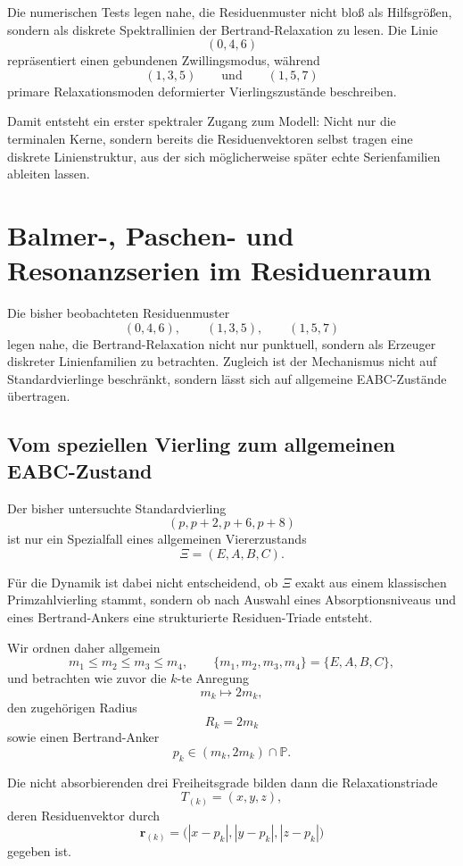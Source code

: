 \documentclass[11pt,a4paper]{article}
\theoremstyle{definition}
\theoremstyle{plain}
\theoremstyle{remark}
\begin{document}
	Die numerischen Tests legen nahe, die Residuenmuster nicht bloß als Hilfsgrößen, sondern als diskrete Spektrallinien der Bertrand-Relaxation zu lesen. 
	Die Linie
	\[
	(0,4,6)
	\]
	repräsentiert einen gebundenen Zwillingsmodus, während
	\[
	(1,3,5)
	\qquad\text{und}\qquad
	(1,5,7)
	\]
	primare Relaxationsmoden deformierter Vierlingszustände beschreiben.
	
	Damit entsteht ein erster spektraler Zugang zum Modell: 
	Nicht nur die terminalen Kerne, sondern bereits die Residuenvektoren selbst tragen eine diskrete Linienstruktur, aus der sich möglicherweise später echte Serienfamilien ableiten lassen.
	
	\section{Balmer-, Paschen- und Resonanzserien im Residuenraum}
	
	Die bisher beobachteten Residuenmuster
	\[
	(0,4,6),\qquad (1,3,5),\qquad (1,5,7)
	\]
	legen nahe, die Bertrand-Relaxation nicht nur punktuell, sondern als Erzeuger diskreter Linienfamilien zu betrachten. 
	Zugleich ist der Mechanismus nicht auf Standardvierlinge beschränkt, sondern lässt sich auf allgemeine EABC-Zustände übertragen.
	
	\subsection{Vom speziellen Vierling zum allgemeinen EABC-Zustand}
	
	Der bisher untersuchte Standardvierling
	\[
	(p,p+2,p+6,p+8)
	\]
	ist nur ein Spezialfall eines allgemeinen Viererzustands
	\[
	\Xi=(E,A,B,C).
	\]
	
	Für die Dynamik ist dabei nicht entscheidend, ob \(\Xi\) exakt aus einem klassischen Primzahlvierling stammt, sondern ob nach Auswahl eines Absorptionsniveaus und eines Bertrand-Ankers eine strukturierte Residuen-Triade entsteht.
	
	Wir ordnen daher allgemein
	\[
	m_1 \le m_2 \le m_3 \le m_4,
	\qquad
	\{m_1,m_2,m_3,m_4\}=\{E,A,B,C\},
	\]
	und betrachten wie zuvor die \(k\)-te Anregung
	\[
	m_k \mapsto 2m_k,
	\]
	den zugehörigen Radius
	\[
	R_k=2m_k
	\]
	sowie einen Bertrand-Anker
	\[
	p_k\in (m_k,2m_k)\cap \mathbb P.
	\]
	
	Die nicht absorbierenden drei Freiheitsgrade bilden dann die Relaxationstriade
	\[
	T_{(k)}=(x,y,z),
	\]
	deren Residuenvektor durch
	\[
	\mathbf r_{(k)}
	=
	\bigl(
	|x-p_k|,
	|y-p_k|,
	|z-p_k|
	\bigr)
	\]
	gegeben ist.
	
\end{document}
